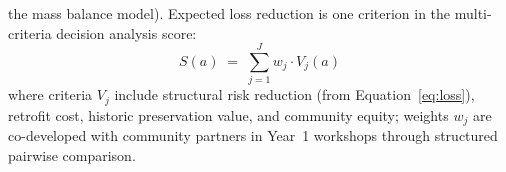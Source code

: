 \documentclass[11pt]{article}
\begin{document}
the mass balance model).
Expected loss reduction is one criterion in the multi-criteria decision analysis
score:
\begin{equation}\label{eq:mcda}
  S(a) \;=\; \sum_{j=1}^{J} w_j \cdot V_j(a)
\end{equation}
where criteria $V_j$ include structural risk reduction (from Equation~\eqref{eq:loss}), retrofit
cost, historic preservation value, and community equity; weights $w_j$ are
co-developed with community partners in Year~1 workshops through structured pairwise
comparison.
\end{document}
